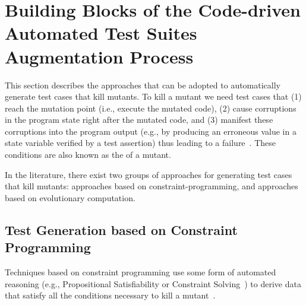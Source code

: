 \clearpage
\section{Building Blocks of the Code-driven Automated Test Suites Augmentation Process}
\label{sec:testGeneration}

This section describes the approaches that can be adopted to automatically generate test cases that kill mutants.
To kill a mutant we need test cases that (1) reach the mutation point (i.e., execute the mutated code), (2) cause 
corruptions
in the program state right after the mutated code,
and (3) manifest these corruptions into the program output 
(e.g., by producing an erroneous value in a state variable verified by a test assertion) 
thus leading to a failure~\cite{papadakis2019mutation}. These conditions are also known as the  of a mutant.

In the literature, there exist two groups of approaches for 
generating test cases that kill mutants:
approaches based on constraint-programming, and approaches based on evolutionary computation.

\subsection{Test Generation based on Constraint Programming}
\label{sec:testGen:CP}

Techniques based on constraint programming use some form of automated reasoning (e.g., Propositional Satisfiability or Constraint Solving~\cite{SATandCPsurvey:2006}) to derive data that satisfy all the conditions necessary to kill a mutant~\cite{offutt1997automatically}.

